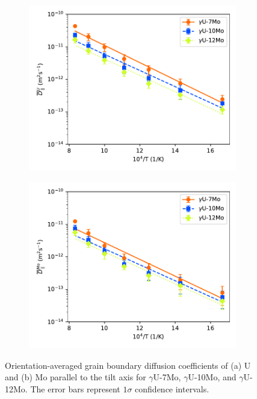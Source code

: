 \documentclass{elsarticle}
\providecommand{\DIFadd}[1]{{\protect\color{blue} \sf #1}} %
\providecommand{\DIFaddFL}[1]{\DIFadd{#1}} %
\providecommand{\DIFaddbeginFL}{} %
\providecommand{\DIFaddendFL}{} %
\begin{document}
\begin{figure}[!ht]
\begin{subfigure}{0.49\textwidth}
	\centering
	\caption{}
	\includegraphics[width=\textwidth]{comp_U_Dz.pdf}
\end{subfigure}
\begin{subfigure}{0.49\textwidth}
	\centering
	\caption{}
	\includegraphics[width=\textwidth]{comp_Mo_Dz.pdf}
\end{subfigure}
\caption{Orientation-averaged grain boundary diffusion coefficients of (a) U and (b) Mo parallel to the tilt axis for $\gamma$U-7Mo, $\gamma$U-10Mo, and $\gamma$U-12Mo. \DIFaddbeginFL \DIFaddFL{The error bars represent $1\sigma$ confidence intervals.}\DIFaddendFL }
\label{fig:comp}
\end{figure}
\end{document}
